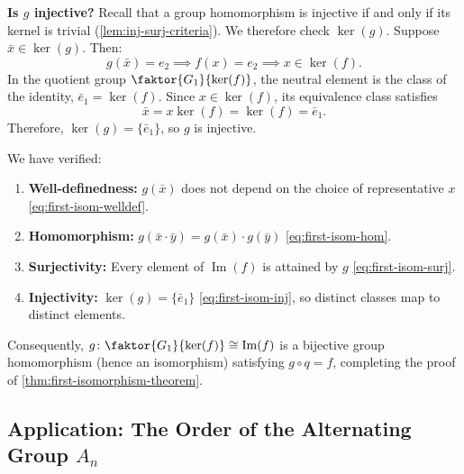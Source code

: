 \begin{proofWrapper}
\begin{content}
\textbf{Is $g$ injective?} Recall that a group homomorphism is injective if and only if its kernel is trivial (\cref{lem:inj-surj-criteria}). We therefore check $\ker(g)$. Suppose $\bar{x} \in \ker(g)$. Then:
\begin{equation}\label{eq:injectivity-kernel-step}
g(\bar{x}) = e_2 \implies f(x) = e_2 \implies x \in \ker(f).
\end{equation}
In the quotient group $\faktor{G_1}{\ker(f)}$, the neutral element is the class of the identity, $\bar{e}_1 = \ker(f)$. Since $x \in \ker(f)$, its equivalence class satisfies
\begin{equation}\label{eq:first-isom-inj}
\bar{x} = x \ker(f) = \ker(f) = \bar{e}_1.
\end{equation}
Therefore, $\ker(g) = \{\bar{e}_1\}$, so $g$ is injective.

\begin{steps}
We have verified:
\begin{enumerate}[label=\textbf{(\arabic*)}]
    \item \textbf{Well-definedness:} $g(\bar{x})$ does not depend on the choice of representative $x$ \eqref{eq:first-isom-welldef}.
    \item \textbf{Homomorphism:} $g(\bar{x} \cdot \bar{y}) = g(\bar{x}) \cdot g(\bar{y})$ \eqref{eq:first-isom-hom}.
    \item \textbf{Surjectivity:} Every element of $\operatorname{Im}(f)$ is attained by $g$ \eqref{eq:first-isom-surj}.
    \item \textbf{Injectivity:} $\ker(g) = \{\bar{e}_1\}$ \eqref{eq:first-isom-inj}, so distinct classes map to distinct elements.
\end{enumerate}
Consequently, $g \colon \faktor{G_1}{\ker(f)} \cong \operatorname{Im}(f)$ is a bijective group homomorphism (hence an isomorphism) satisfying $g \circ q = f$, completing the proof of \cref{thm:first-isomorphism-theorem}.
\end{steps}
\end{content}

\end{proofWrapper}

\subsection{Application: The Order of the Alternating Group \texorpdfstring{$A_n$}{A\_n}}

